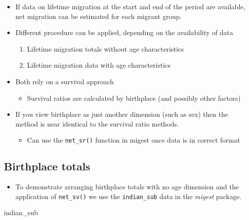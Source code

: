 \documentclass[
]{book}
\newenvironment{Shaded}{\begin{snugshade}}{\end{snugshade}}
\newcommand{\NormalTok}[1]{#1}
\providecommand{\tightlist}{%
  \setlength{\itemsep}{0pt}\setlength{\parskip}{0pt}}
\begin{document}
\begin{itemize}
\tightlist
\item
  If data on lifetime migration at the start and end of the period are available, net migration can be estimated for each migrant group.
\item
  Different procedure can be applied, depending on the availability of data

  \begin{enumerate}
  \def\labelenumi{\arabic{enumi}.}
  \tightlist
  \item
    Lifetime migration totals without age characteristics
  \item
    Lifetime migration data with age characteristics
  \end{enumerate}
\item
  Both rely on a survival approach

  \begin{itemize}
  \tightlist
  \item
    Survival ratios are calculated by birthplace (and possibly other factors)
  \end{itemize}
\item
  If you view birthplace as just another dimension (such as sex) then the method is near identical to the survival ratio methods.

  \begin{itemize}
  \tightlist
  \item
    Can use the \texttt{net\_sr()} function in migest once data is in correct format
  \end{itemize}
\end{itemize}

\hypertarget{birthplace-totals}{%
\subsection{Birthplace totals}\label{birthplace-totals}}

\begin{itemize}
\tightlist
\item
  To demonstrate arranging birthplace totals with no age dimension and the application of \texttt{net\_sv()} we use the \texttt{indian\_sub} data in the \emph{migest} package.
\end{itemize}

\begin{Shaded}
\begin{Highlighting}[]
\NormalTok{indian\_sub}
\end{Highlighting}
\end{Shaded}
\end{document}
